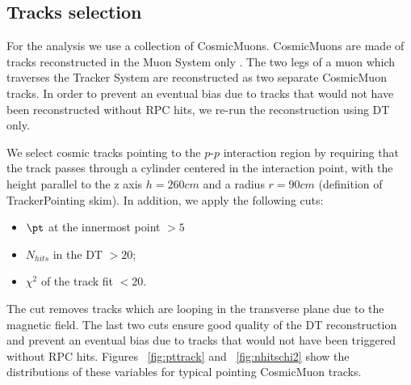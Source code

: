 \subsection{Tracks selection}
For the analysis we use a collection of CosmicMuons.
CosmicMuons are made of tracks reconstructed in the
Muon System only .
The two legs of a muon which traverses
the Tracker System are reconstructed as two separate 
CosmicMuon tracks.
In order to prevent an eventual bias due to tracks 
that would not have been reconstructed without
RPC hits, we re-run the reconstruction using DT only.

We select cosmic tracks pointing to the $p$-$p$ interaction
region by requiring that the track passes through a cylinder 
centered in the interaction point, with the height parallel 
to the z axis $h = 260 cm$ and a radius $r = 90 cm$ 
(definition of TrackerPointing skim). In addition, we apply the following 
cuts:
\begin{itemize}
\item
$\pt$ at the innermost point $ > 5$\GeVc 
\item
$N_{hits}$ in the DT $ > 20 $;
\item
$\chi^2$ of the track fit $ < 20 $.
\end{itemize}
The \pt cut removes tracks which are
looping in the transverse plane due 
to the magnetic field. The last two cuts 
ensure good quality of the DT reconstruction 
and prevent an eventual bias due to 
tracks that would not have been triggered 
without RPC hits.
Figures ~\ref{fig:pttrack} and ~\ref{fig:nhitschi2} show 
the distributions of these variables for typical pointing
CosmicMuon tracks.

